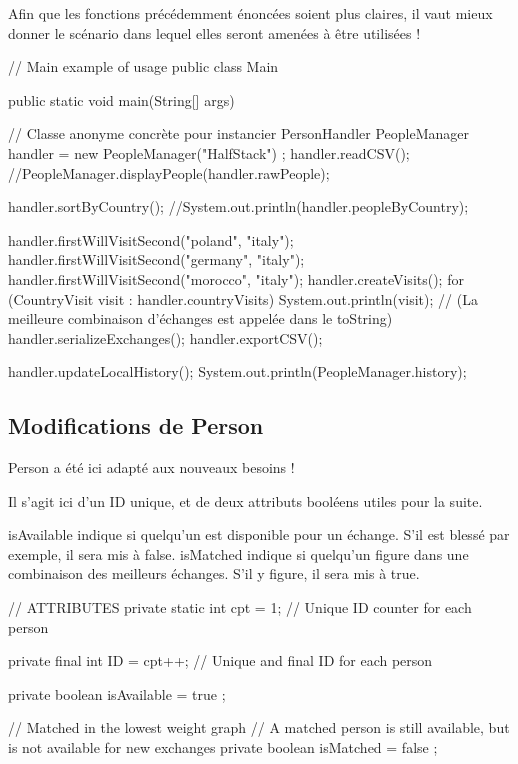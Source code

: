 \documentclass{mytex}
\begin{document}

Afin que les fonctions précédemment énoncées soient plus claires, il vaut mieux donner le scénario dans lequel elles seront amenées à être utilisées ! 

\begin{codebox}
// Main example of usage
public class Main {
	public static void main(String[] args) {
		// Classe anonyme concrète pour instancier PersonHandler
		PeopleManager handler = new PeopleManager("HalfStack") {};
		handler.readCSV();
		//PeopleManager.displayPeople(handler.rawPeople);
		
		handler.sortByCountry();
		//System.out.println(handler.peopleByCountry);
		
		handler.firstWillVisitSecond("poland", "italy");
		handler.firstWillVisitSecond("germany", "italy");
		handler.firstWillVisitSecond("morocco", "italy");
		handler.createVisits();
		for (CountryVisit visit : handler.countryVisits) {
			System.out.println(visit); 
			// (La meilleure combinaison d'échanges est appelée dans le toString)
		}
		handler.serializeExchanges();
		handler.exportCSV();
		
		handler.updateLocalHistory();
		System.out.println(PeopleManager.history);
	}
}
\end{codebox}


\subsection{Modifications de Person}

Person a été ici adapté aux nouveaux besoins !


Il s'agit ici d'un ID unique, et de deux attributs booléens utiles pour la suite.

isAvailable indique si quelqu'un est disponible pour un échange. S'il est blessé par exemple, il sera mis à false.
isMatched indique si quelqu'un figure dans une combinaison des meilleurs échanges. S'il y figure, il sera mis à true.

\begin{codebox}
// ATTRIBUTES
private static int cpt = 1; // Unique ID counter for each person

private final int ID = cpt++; // Unique and final ID for each person

private boolean isAvailable = true ; 

// Matched in the lowest weight graph
// A matched person is still available, but is not available for new exchanges
private boolean isMatched = false ; 
\end{codebox}
\end{document}
